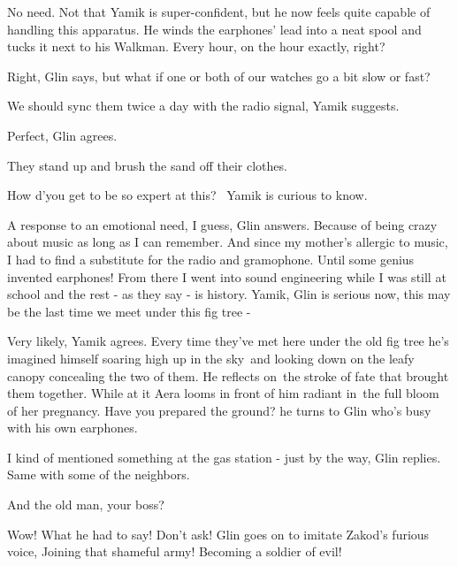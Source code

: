 \documentclass[letterpaper]{article}
\begin{document}
{\textquotedbl}No need.{\textquotedbl} Not that Yamik is super-confident, but he now feels quite capable of handling
this apparatus. He winds the earphones' lead into a neat spool and tucks it next to his Walkman. {\textquotedbl}Every
hour, on the hour exactly, right?{\textquotedbl} \ 

{\textquotedbl}Right,{\textquotedbl} Glin says, {\textquotedbl}but what if one or both of our watches go a bit slow or
fast?{\textquotedbl} 

{\textquotedbl}We should sync them twice a day with the radio signal,{\textquotedbl} Yamik suggests. 

{\textquotedbl}Perfect,{\textquotedbl} Glin agrees.

They stand up and brush the sand off their clothes. 

{\textquotedbl}How d'you get to be so expert at this?{\textquotedbl} \ Yamik is curious to know.

{\textquotedbl}A response to an emotional need, I guess,{\textquotedbl} Glin answers. {\textquotedbl}Because of being
crazy about music as long as I can remember. And since my mother's allergic to music, I had to find a substitute for
the radio and gramophone. Until some genius invented earphones! From there I went into sound engineering while I was
still at school and the rest - as they say - is history. Yamik,{\textquotedbl} Glin is serious now, {\textquotedbl}this
may be the last time we meet under this fig tree -{\textquotedbl} 

{\textquotedbl}Very likely,{\textquotedbl} Yamik agrees. Every time they've met here under the old fig tree he's
imagined himself soaring high up in the sky~and looking down on the leafy canopy concealing the two of them. He
reflects on~the stroke of fate that brought them together. While at it Aera looms in front of him radiant in~the full
bloom of her pregnancy. {\textquotedbl}Have you prepared the ground?{\textquotedbl} he turns to Glin who's busy with
his own earphones.

{\textquotedbl}I kind of mentioned something at the gas station - just by the way,{\textquotedbl} Glin replies.
{\textquotedbl}Same with some of the neighbors.{\textquotedbl} 

{\textquotedbl}And the old man, your boss?{\textquotedbl} 

{\textquotedbl}Wow! What he had to say! Don't ask!{\textquotedbl} Glin goes on to imitate Zakod's furious voice,
{\textquotedbl}Joining that shameful army! Becoming a soldier of evil!{\textquotedbl} 
\end{document}
